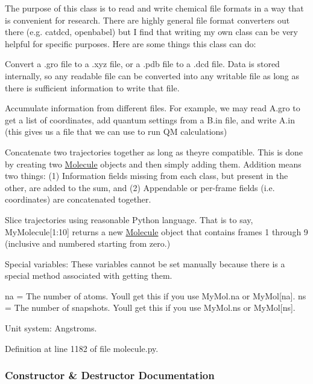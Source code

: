 The purpose of this class is to read and write chemical file formats in a way that is convenient for research. There are highly general file format converters out there (e.\+g. catdcd, openbabel) but I find that writing my own class can be very helpful for specific purposes. Here are some things this class can do\+:


\begin{DoxyItemize}
\item Convert a .gro file to a .xyz file, or a .pdb file to a .dcd file. Data is stored internally, so any readable file can be converted into any writable file as long as there is sufficient information to write that file.
\item Accumulate information from different files. For example, we may read A.\+gro to get a list of coordinates, add quantum settings from a B.\+in file, and write A.\+in (this gives us a file that we can use to run QM calculations)
\item Concatenate two trajectories together as long as they\textquotesingle{}re compatible. This is done by creating two \hyperlink{classsrc_1_1molecule_1_1Molecule}{Molecule} objects and then simply adding them. Addition means two things\+: (1) Information fields missing from each class, but present in the other, are added to the sum, and (2) Appendable or per-\/frame fields (i.\+e. coordinates) are concatenated together.
\item Slice trajectories using reasonable Python language. That is to say, My\+Molecule\mbox{[}1\+:10\mbox{]} returns a new \hyperlink{classsrc_1_1molecule_1_1Molecule}{Molecule} object that contains frames 1 through 9 (inclusive and numbered starting from zero.)
\end{DoxyItemize}

Special variables\+: These variables cannot be set manually because there is a special method associated with getting them.

na = The number of atoms. You\textquotesingle{}ll get this if you use My\+Mol.\+na or My\+Mol\mbox{[}\textquotesingle{}na\textquotesingle{}\mbox{]}. ns = The number of snapshots. You\textquotesingle{}ll get this if you use My\+Mol.\+ns or My\+Mol\mbox{[}\textquotesingle{}ns\textquotesingle{}\mbox{]}.

Unit system\+: Angstroms. 

Definition at line 1182 of file molecule.\+py.



\subsubsection{Constructor \& Destructor Documentation}
\mbox{\label{classsrc_1_1molecule_1_1Molecule_a8c3f5b48ac288e3b251b42d90c8f8016}} 
